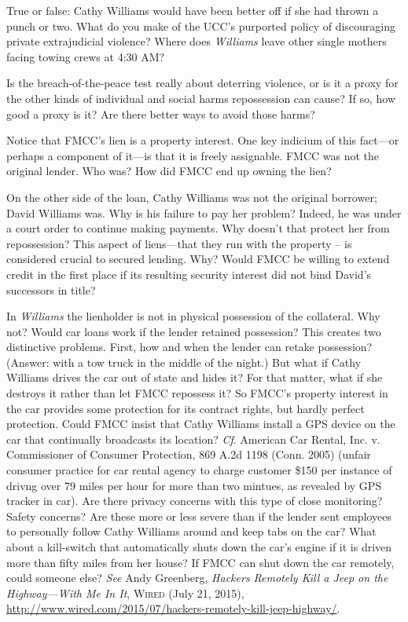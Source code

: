 
\item True or false: Cathy Williams would have been better off if she had thrown
a punch or two. What do you make of the UCC's purported policy of discouraging
private extrajudicial violence? Where does \textit{Williams} leave other single
mothers facing towing crews at 4:30 AM?


\item Is the breach-of-the-peace test really about deterring violence, or is it
a proxy for the other kinds of individual and social harms repossession can
cause? If so, how good a proxy is it? Are there better ways to avoid those
harms?


\item Notice that FMCC's lien is a property interest. One key indicium of this
fact---or perhaps a component of it---is that it is freely assignable. FMCC
was not the original lender. Who was? How did FMCC end up owning the lien? 


\item On the other side of the loan, Cathy Williams was not the original
borrower; David Williams was. Why is his failure to pay her problem? Indeed, he
was under a court order to continue making payments. Why doesn't that protect
her from repossession? This aspect of liens---that they run with the property
-- is considered crucial to secured lending. Why? Would FMCC be willing to
extend credit in the first place if its resulting security interest did not
bind David's successors in title?


\item In \textit{Williams} the lienholder is not in physical possession of the
collateral. Why not? Would car loans work if the lender retained possession?
This creates two distinctive problems. First, how and when the lender can
retake possession? (Answer: with a tow truck in the middle of the night.) But
what if Cathy Williams drives the car out of state and hides it? For that
matter, what if she destroys it rather than let FMCC repossess it? So FMCC's
property interest in the car provides some protection for its contract rights,
but hardly perfect protection. Could FMCC insist that Cathy Williams install a
GPS device on the car that continually broadcasts its location? \textit{Cf}.
American Car Rental, Inc. v. Commissioner of Consumer Protection, 869 A.2d 1198
(Conn. 2005) (unfair consumer practice for car rental agency to charge customer
\$150 per instance of drivng over 79 miles per hour for more than two mintues,
as revealed by GPS tracker in car). Are there privacy concerns with this type
of close monitoring? Safety concerns? Are these more or less severe than if the
lender sent employees to personally follow Cathy Williams around and keep tabs
on the car? What about a kill-switch that automatically shuts down the car's
engine if it is driven more than fifty miles from her house? If FMCC can shut
down the car remotely, could someone else? \textit{See} Andy Greenberg,
\textit{Hackers Remotely Kill a Jeep on the Highway---With Me In It},
\textsc{Wired} (July 21, 2015),
\url{http://www.wired.com/2015/07/hackers-remotely-kill-jeep-highway/}.


